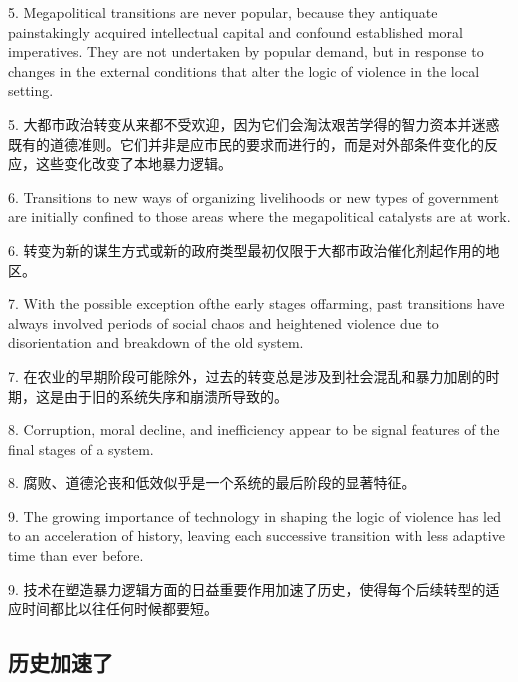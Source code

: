\begin{Parallel}{97mm}{45mm}
  \ParallelLText
  {5. Megapolitical transitions are never popular, because they antiquate painstakingly acquired intellectual capital and confound established moral imperatives. They are not undertaken by popular demand, but in response to changes in the external conditions that alter the logic of violence in the local setting.}
  
  \ParallelRText
  {5. 大都市政治转变从来都不受欢迎，因为它们会淘汰艰苦学得的智力资本并迷惑既有的道德准则。它们并非是应市民的要求而进行的，而是对外部条件变化的反应，这些变化改变了本地暴力逻辑。}
  \ParallelPar



  \ParallelLText
  {6. Transitions to new ways of organizing livelihoods or new types of government are initially confined to those areas where the megapolitical catalysts are at work.}
  
  \ParallelRText
  {6. 转变为新的谋生方式或新的政府类型最初仅限于大都市政治催化剂起作用的地区。}
  \ParallelPar



  \ParallelLText
  {7. With the possible exception ofthe early stages offarming, past transitions have always involved periods of social chaos and heightened violence due to disorientation and breakdown of the old system.}
  
  \ParallelRText
  {7. 在农业的早期阶段可能除外，过去的转变总是涉及到社会混乱和暴力加剧的时期，这是由于旧的系统失序和崩溃所导致的。}
  \ParallelPar



  \ParallelLText
  {8. Corruption, moral decline, and inefficiency appear to be signal features of the final stages of a system.}
  
  \ParallelRText
  {8. 腐败、道德沦丧和低效似乎是一个系统的最后阶段的显著特征。}
  \ParallelPar



  \ParallelLText
  {9. The growing importance of technology in shaping the logic of violence has led to an acceleration of history, leaving each successive transition with less adaptive time than ever before.}
  
  \ParallelRText
  {9. 技术在塑造暴力逻辑方面的日益重要作用加速了历史，使得每个后续转型的适应时间都比以往任何时候都要短。}
  \ParallelPar

  \subsection{历史加速了}


\end{Parallel}
